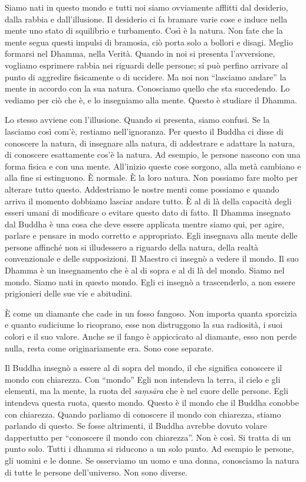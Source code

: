Siamo nati in questo mondo e tutti noi siamo ovviamente afflitti dal
desiderio, dalla rabbia e dall'illusione. Il desiderio ci fa bramare
varie cose e induce nella mente uno stato di squilibrio e turbamento.
Così è la natura. Non fate che la mente segua questi impulsi di
bramosia, ciò porta solo a bollori e disagi. Meglio formarsi nel Dhamma,
nella Verità. Quando in noi si presenta l'avversione, vogliamo esprimere
rabbia nei riguardi delle persone; si può perfino arrivare al punto di
aggredire fisicamente o di uccidere. Ma noi non ``lasciamo andare'' la
mente in accordo con la sua natura. Conosciamo quello che sta
succedendo. Lo vediamo per ciò che è, e lo insegniamo alla mente. Questo
è studiare il Dhamma.

Lo stesso avviene con l'illusione. Quando si presenta, siamo confusi. Se
la lasciamo così com'è, restiamo nell'ignoranza. Per questo il Buddha ci
disse di conoscere la natura, di insegnare alla natura, di addestrare e
adattare la natura, di conoscere esattamente cos'è la natura. Ad
esempio, le persone nascono con una forma fisica e con una mente.
All'inizio queste cose sorgono, alla metà cambiano e alla fine si
estinguono. È normale. È la loro natura. Non possiamo fare molto per
alterare tutto questo. Addestriamo le nostre menti come possiamo e
quando arriva il momento dobbiamo lasciar andare tutto. È al di là della
capacità degli esseri umani di modificare o evitare questo dato di
fatto. Il Dhamma insegnato dal Buddha è una cosa che deve essere
applicata mentre siamo qui, per agire, parlare e pensare in modo
corretto e appropriato. Egli insegnava alla mente delle persone affinché
non si illudessero a riguardo della natura, della realtà convenzionale e
delle supposizioni. Il Maestro ci insegnò a vedere il mondo. Il suo
Dhamma è un insegnamento che è al di sopra e al di là del mondo. Siamo
nel mondo. Siamo nati in questo mondo. Egli ci insegnò a trascenderlo, a
non essere prigionieri delle sue vie e abitudini.

È come un diamante che cade in un fosso fangoso. Non importa quanta
sporcizia e quanto sudiciume lo ricoprano, esse non distruggono la sua
radiosità, i suoi colori e il suo valore. Anche se il fango è
appiccicato al diamante, esso non perde nulla, resta come
originariamente era. Sono cose separate.

Il Buddha insegnò a essere al di sopra del mondo, il che significa
conoscere il mondo con chiarezza. Con ``mondo'' Egli non intendeva la
terra, il cielo e gli elementi, ma la mente, la ruota del \emph{saṃsāra}
che è nel cuore delle persone. Egli intendeva questa ruota, questo
mondo. Questo è il mondo che il Buddha conobbe con chiarezza. Quando
parliamo di conoscere il mondo con chiarezza, stiamo parlando di questo.
Se fosse altrimenti, il Buddha avrebbe dovuto volare dappertutto per
``conoscere il mondo con chiarezza''. Non è così. Si tratta di un punto
solo. Tutti i dhamma si riducono a un solo punto. Ad esempio le
persone, gli uomini e le donne. Se osserviamo un uomo e una donna,
conosciamo la natura di tutte le persone dell'universo. Non sono
diverse.

